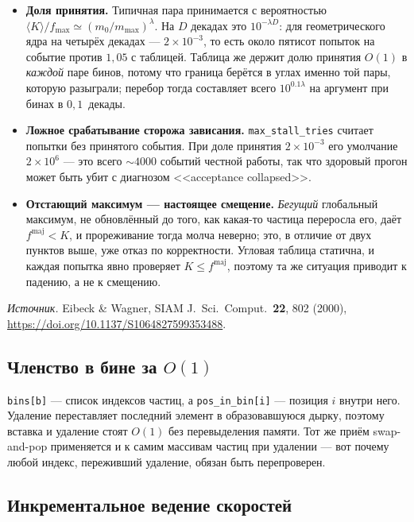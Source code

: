 \documentclass[a4paper,12pt]{article}
\newcommand{\fmaj}{f^{\mathrm{maj}}}
\newcommand{\code}[1]{\texttt{#1}}
\begin{document}
\begin{itemize}
  \item \textbf{Доля принятия.} Типичная пара принимается с вероятностью
        $\langle K\rangle/f_{\max} \simeq (m_0/m_{\max})^{\lambda}$. На $D$
        декадах это $10^{-\lambda D}$: для геометрического ядра на четырёх
        декадах --- $2\times10^{-3}$, то есть около пятисот попыток на
        событие против $1{,}05$ с таблицей. Таблица же держит долю принятия
        $O(1)$ в \emph{каждой} паре бинов, потому что граница берётся в углах
        именно той пары, которую разыграли; перебор тогда составляет всего
        $10^{0.1\lambda}$ на аргумент при бинах в $0{,}1$~декады.
  \item \textbf{Ложное срабатывание сторожа зависания.}
        \code{max\_stall\_tries} считает попытки без принятого события. При
        доле принятия $2\times10^{-3}$ его умолчание $2\times10^{6}$ ---
        это всего $\sim\!4000$ событий честной работы, так что здоровый
        прогон может быть убит с диагнозом <<acceptance collapsed>>.
  \item \textbf{Отстающий максимум --- настоящее смещение.} \emph{Бегущий}
        глобальный максимум, не обновлённый до того, как какая-то частица
        переросла его, даёт $\fmaj < K$, и прореживание тогда молча неверно;
        это, в отличие от двух пунктов выше, уже отказ по корректности.
        Угловая таблица статична, и каждая попытка явно проверяет
        $K \le \fmaj$, поэтому та же ситуация приводит к падению, а не к
        смещению.
\end{itemize}

\emph{Источник.} Eibeck \& Wagner, SIAM J.~Sci.\ Comput.\ \textbf{22}, 802
(2000),
\url{https://doi.org/10.1137/S1064827599353488}.

\subsection{Членство в бине за $O(1)$}
\label{sec:trick3}

\code{bins[b]} --- список индексов частиц, а \code{pos\_in\_bin[i]} ---
позиция $i$ внутри него. Удаление переставляет последний элемент в
образовавшуюся дырку, поэтому вставка и удаление стоят $O(1)$ без
перевыделения памяти. Тот же приём swap-and-pop применяется и к самим
массивам частиц при удалении --- вот почему любой индекс, переживший
удаление, обязан быть перепроверен.

\subsection{Инкрементальное ведение скоростей}
\label{sec:trick4}
\end{document}
